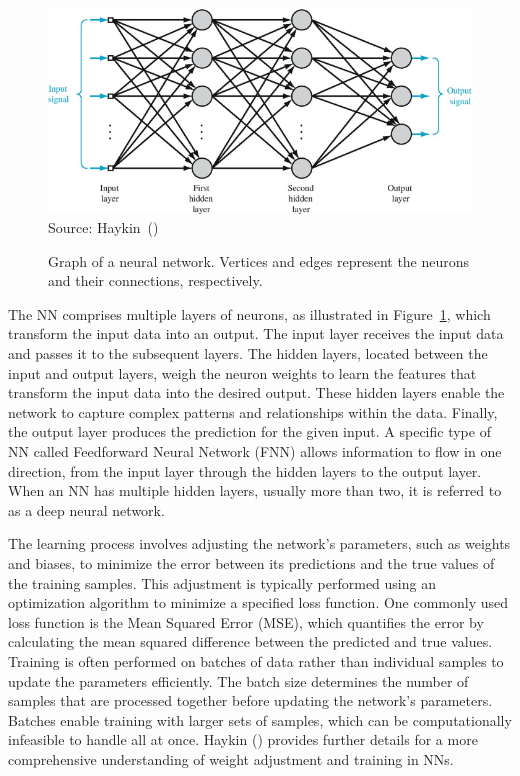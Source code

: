 \begin{figure}
    \caption[Graph of a neural network.]{Graph of a neural network. Vertices and edges represent the neurons and their connections, respectively.}
    \label{fig:neuralnetwork}
    \addvspace{\baselineskip}
    \centering
    \includegraphics[width=0.9\linewidth]{figures/network.png} \\
    \addvspace{\baselineskip}
    Source: Haykin~(\citeyear{Haykin/2009})
\end{figure}

The NN comprises multiple layers of neurons, as illustrated in Figure~\ref{fig:neuralnetwork}, which transform the input data into an output. The input layer receives the input data and passes it to the subsequent layers. The hidden layers, located between the input and output layers, weigh the neuron weights to learn the features that transform the input data into the desired output. These hidden layers enable the network to capture complex patterns and relationships within the data. Finally, the output layer produces the prediction for the given input. A specific type of NN called Feedforward Neural Network (FNN) allows information to flow in one direction, from the input layer through the hidden layers to the output layer. When an NN has multiple hidden layers, usually more than two, it is referred to as a deep neural network.

The learning process involves adjusting the network's parameters, such as weights and biases, to minimize the error between its predictions and the true values of the training samples. This adjustment is typically performed using an optimization algorithm to minimize a specified loss function. One commonly used loss function is the Mean Squared Error (MSE), which quantifies the error by calculating the mean squared difference between the predicted and true values. Training is often performed on batches of data rather than individual samples to update the parameters efficiently. The batch size determines the number of samples that are processed together before updating the network's parameters. Batches enable training with larger sets of samples, which can be computationally infeasible to handle all at once. Haykin (\citeyear{Haykin/2009}) provides further details for a more comprehensive understanding of weight adjustment and training in NNs.

